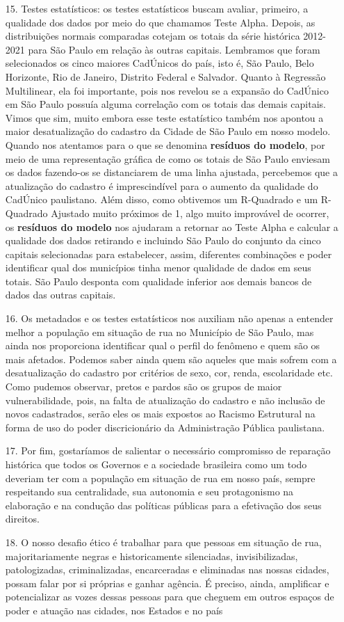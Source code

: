 \documentclass[14pt]{extarticle}
\begin{document}
\begin{enumerate}
    \item[15.] Testes estatísticos: os testes estatísticos buscam avaliar, primeiro, a qualidade dos dados por meio do que chamamos Teste Alpha. Depois, as distribuições normais comparadas cotejam os totais da série histórica 2012-2021 para São Paulo em relação às outras capitais. Lembramos que foram selecionados os cinco maiores CadÚnicos do país, isto é, São Paulo, Belo Horizonte, Rio de Janeiro, Distrito Federal e Salvador. Quanto à Regressão Multilinear, ela foi importante, pois nos revelou se a expansão do CadÚnico em São Paulo possuía alguma correlação com os totais das demais capitais. Vimos que sim, muito embora esse teste estatístico também nos apontou a maior desatualização do cadastro da Cidade de São Paulo em nosso modelo. Quando nos atentamos para o que se denomina \textbf{resíduos do modelo}, por meio de uma representação gráfica de como os totais de São Paulo enviesam os dados fazendo-os se distanciarem de uma linha ajustada, percebemos que a atualização do cadastro é imprescindível para o aumento da qualidade do CadÚnico paulistano. Além disso, como obtivemos um R-Quadrado e um R-Quadrado Ajustado muito próximos de 1, algo muito improvável de ocorrer, os \textbf{resíduos do modelo} nos ajudaram a retornar ao Teste Alpha e calcular a qualidade dos dados retirando e incluindo São Paulo do conjunto da cinco capitais selecionadas para estabelecer, assim, diferentes combinações e poder identificar qual dos municípios tinha menor qualidade de dados em seus totais. São Paulo desponta com qualidade inferior aos demais bancos de dados das outras capitais.
    \item[16.] Os metadados e os testes estatísticos nos auxiliam não apenas a entender melhor a população em situação de rua no Município de São Paulo, mas ainda nos proporciona identificar qual o perfil do fenômeno e quem são os mais afetados. Podemos saber ainda quem são aqueles que mais sofrem com a desatualização do cadastro por critérios de sexo, cor, renda, escolaridade etc. Como pudemos observar, pretos e pardos são os grupos de maior vulnerabilidade, pois, na falta de atualização do cadastro e não inclusão de novos cadastrados, serão eles os mais expostos ao Racismo Estrutural na forma de uso do poder discricionário da Administração Pública paulistana.
  \item[17.] Por fim, gostaríamos de salientar o necessário compromisso de reparação histórica que todos os Governos e a sociedade brasileira como um todo deveriam ter com a população em situação de rua em nosso país, sempre respeitando sua centralidade, sua autonomia e seu protagonismo na elaboração e na condução das políticas públicas para a efetivação dos seus direitos. 
  \item[18.] O nosso desafio ético é trabalhar para que pessoas em situação de rua, majoritariamente negras e historicamente silenciadas, invisibilizadas, patologizadas, criminalizadas, encarceradas e eliminadas nas nossas cidades, possam falar por si próprias e ganhar agência. É preciso, ainda, amplificar e potencializar as vozes dessas pessoas para que cheguem em outros espaços de poder e atuação nas cidades, nos Estados e no país
\end{enumerate}

%
%
\begingroup
{}

\endgroup
\end{document}
